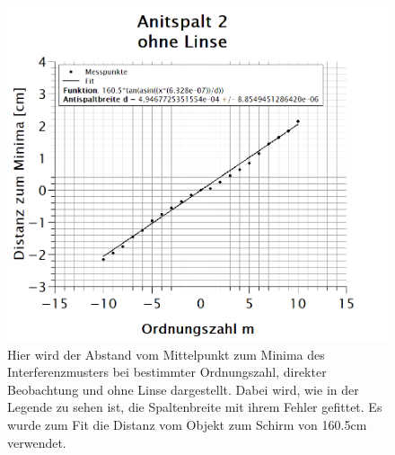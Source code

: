 \begin{figure}[h]
\centering
\includegraphics[width=\textwidth]{Bilder/antispalt2_ohneLinse.png}
\vspace*{-1cm}
\caption[Antispalt 2: ohne Linse]{Hier wird der Abstand vom Mittelpunkt zum Minima des Interferenzmusters bei bestimmter Ordnungszahl, direkter Beobachtung und ohne Linse dargestellt. Dabei wird, wie in der Legende zu sehen ist, die Spaltenbreite mit ihrem Fehler gefittet. Es wurde zum Fit die Distanz vom Objekt zum Schirm von 160.5cm verwendet.}
\label{fig:antispalt2_ohneLinse}
\end{figure}
\newpage

